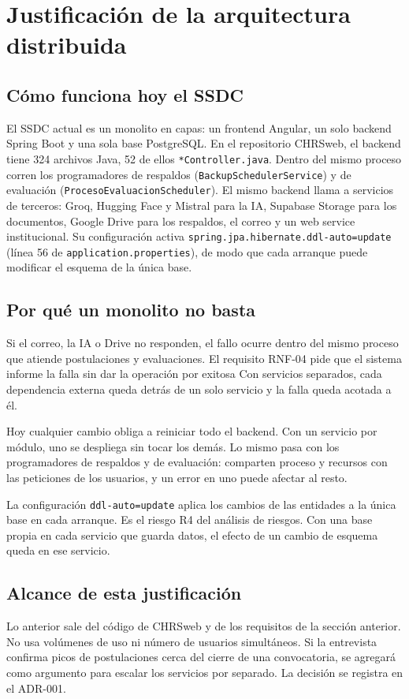 \section{Justificación de la arquitectura distribuida}

\subsection{Cómo funciona hoy el SSDC}

El SSDC actual es un monolito en capas: un frontend Angular, un solo backend Spring Boot y una sola base PostgreSQL. En el repositorio CHRSweb, el backend tiene 324 archivos Java, 52 de ellos \texttt{*Controller.java}. Dentro del mismo proceso corren los programadores de respaldos (\texttt{Backup\allowbreak SchedulerService}) y de evaluación (\texttt{Proceso\allowbreak Evaluacion\allowbreak Scheduler}). El mismo backend llama a servicios de terceros: Groq, Hugging Face y Mistral para la IA, Supabase Storage para los documentos, Google Drive para los respaldos, el correo y un web service institucional. Su configuración activa \texttt{spring.jpa.\allowbreak hibernate.\allowbreak ddl-auto=update} (línea 56 de \texttt{application.properties}), de modo que cada arranque puede modificar el esquema de la única base.

\subsection{Por qué un monolito no basta}

Si el correo, la IA o Drive no responden, el fallo ocurre dentro del mismo proceso que atiende postulaciones y evaluaciones. El requisito RNF-04 pide que el sistema informe la falla sin dar la operación por exitosa Con servicios separados, cada dependencia externa queda detrás de un solo servicio y la falla queda acotada a él.

Hoy cualquier cambio obliga a reiniciar todo el backend. Con un servicio por módulo, uno se despliega sin tocar los demás. Lo mismo pasa con los programadores de respaldos y de evaluación: comparten proceso y recursos con las peticiones de los usuarios, y un error en uno puede afectar al resto.

La configuración \texttt{ddl-auto=update} aplica los cambios de las entidades a la única base en cada arranque. Es el riesgo R4 del análisis de riesgos. Con una base propia en cada servicio que guarda datos, el efecto de un cambio de esquema queda en ese servicio.

\subsection{Alcance de esta justificación}

Lo anterior sale del código de CHRSweb y de los requisitos de la sección anterior. No usa volúmenes de uso ni número de usuarios simultáneos. Si la entrevista confirma picos de postulaciones cerca del cierre de una convocatoria, se agregará como argumento para escalar los servicios por separado. La decisión se registra en el ADR-001.
